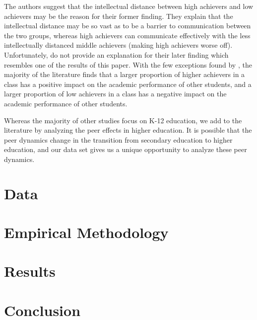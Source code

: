 \documentclass[12pt,letterpaper,english,fleqn]{article}
\newcommand{\sectlabel}[1]{section~\ref{#1} (\nameref{#1})}
\begin{document}
The authors suggest that the intellectual distance between high achievers and low achievers may be the reason for their former finding.
They explain that the intellectual distance may be so vast as to be a barrier to communication between the two groups, whereas high achievers can communicate effectively with the less intellectually distanced middle achievers (making high achievers worse off). 
Unfortunately, \citeauthor{burke2013classroom} do not provide an explanation for their later finding which resembles one of the results of this paper.
With the few exceptions found by \citet{burke2013classroom}, the majority of the literature finds that a larger proportion of higher achievers in a class has a positive impact on the academic performance of other students, and a larger proportion of low achievers in a class has a negative impact on the academic performance of other students.%

Whereas the majority of other studies focus on K-12 education, we add to the literature by analyzing the peer effects in higher education. 
It is possible that the peer dynamics change in the transition from secondary education to higher education, and our data set gives us a unique opportunity to analyze these peer dynamics.

\section{Data}\label{data}



\section{Empirical Methodology}\label{methods}



\section{Results}\label{results}



\section{Conclusion}\label{conclusion}
\end{document}
